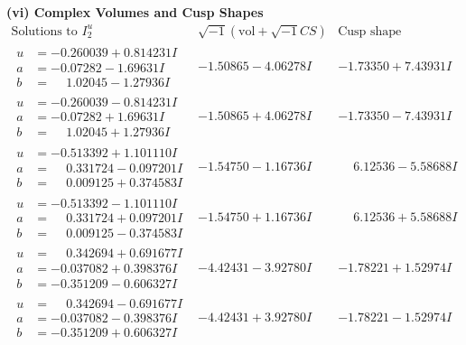 \documentclass[1p]{elsarticle_modified}
\theoremstyle{definition}
\newcommand{\I}{\sqrt{-1}}
\begin{document}
\newpage\flushleft \textbf{(vi) Complex Volumes and Cusp Shapes}
$$\begin{array}{c|c|c}  
\text{Solutions to }I^u_{2}& \I (\text{vol} + \sqrt{-1}CS) & \text{Cusp shape}\\
 \hline 
\begin{aligned}
u &= -0.260039 + 0.814231 I \\
a &= -0.07282 - 1.69631 I \\
b &= \phantom{-}1.02045 - 1.27936 I\end{aligned}
 & -1.50865 - 4.06278 I & -1.73350 + 7.43931 I \\ \hline\begin{aligned}
u &= -0.260039 - 0.814231 I \\
a &= -0.07282 + 1.69631 I \\
b &= \phantom{-}1.02045 + 1.27936 I\end{aligned}
 & -1.50865 + 4.06278 I & -1.73350 - 7.43931 I \\ \hline\begin{aligned}
u &= -0.513392 + 1.101110 I \\
a &= \phantom{-}0.331724 - 0.097201 I \\
b &= \phantom{-}0.009125 + 0.374583 I\end{aligned}
 & -1.54750 - 1.16736 I & \phantom{-}6.12536 - 5.58688 I \\ \hline\begin{aligned}
u &= -0.513392 - 1.101110 I \\
a &= \phantom{-}0.331724 + 0.097201 I \\
b &= \phantom{-}0.009125 - 0.374583 I\end{aligned}
 & -1.54750 + 1.16736 I & \phantom{-}6.12536 + 5.58688 I \\ \hline\begin{aligned}
u &= \phantom{-}0.342694 + 0.691677 I \\
a &= -0.037082 + 0.398376 I \\
b &= -0.351209 - 0.606327 I\end{aligned}
 & -4.42431 - 3.92780 I & -1.78221 + 1.52974 I \\ \hline\begin{aligned}
u &= \phantom{-}0.342694 - 0.691677 I \\
a &= -0.037082 - 0.398376 I \\
b &= -0.351209 + 0.606327 I\end{aligned}
 & -4.42431 + 3.92780 I & -1.78221 - 1.52974 I \\ \hline\begin{aligned}

\end{aligned}
\end{array}$$
\end{document}
